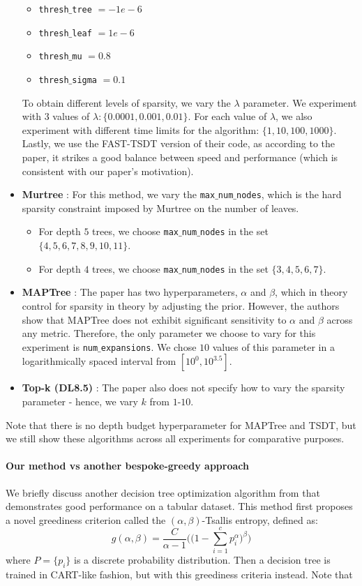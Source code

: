 \begin{itemize}
    \begin{itemize}
        \item \texttt{thresh$\_$tree} $= -1e-6$
        \item \texttt{thresh$\_$leaf} $= 1e-6$
        \item \texttt{thresh$\_$mu} $= 0.8$
        \item \texttt{thresh$\_$sigma} $= 0.1$
    \end{itemize}
    To obtain different levels of sparsity, we vary the $\lambda$ parameter. We experiment with $3$ values of $\lambda: \{0.0001, 0.001, 0.01\}$. For each value of $\lambda$, we also experiment with different time limits for the algorithm: $\{1,10,100,1000\}$. Lastly, we use the FAST-TSDT version of their code, as according to the paper, it strikes a good balance between speed and performance (which is consistent with our paper's motivation).
    \item \textbf{Murtree} \cite{murtree}: For this method, we vary the \texttt{max$\_$num$\_$nodes}, which is the hard sparsity constraint imposed by Murtree on the number of leaves. 
    \begin{itemize}
        \item For depth $5$ trees, we choose \texttt{max$\_$num$\_$nodes} in the set $\{4,5,6,7,8,9,10,11\}$. 
        \item For depth $4$ trees, we choose \texttt{max$\_$num$\_$nodes} in the set $\{3, 4,5,6,7\}$. 
    \end{itemize}
    \item \textbf{MAPTree} \cite{maptree}: The paper has two hyperparameters, $\alpha$ and $\beta$, which in theory control for sparsity in theory by adjusting the prior. However, the authors show that MAPTree does not exhibit significant sensitivity to $\alpha$ and $\beta$ across any metric. Therefore, the only parameter we choose to vary for this experiment is \texttt{num$\_$expansions}. We chose $10$ values of this parameter in a logarithmically spaced interval from $[10^0, 10^{3.5}]$. 
    \item \textbf{Top-k (DL8.5)} \cite{topk}: The paper also does not specify how to vary the sparsity parameter - hence, we vary $k$ from $1$-$10$. 
\end{itemize}
Note that there is no depth budget hyperparameter for MAPTree and TSDT, but we still show these algorithms across all experiments for comparative purposes.
\paragraph{Our method vs another bespoke-greedy approach}
We briefly discuss another decision tree optimization algorithm from \cite{slow_greedy} that demonstrates good performance on a tabular dataset. This method first proposes a novel greediness criterion called the $(\alpha,\beta)$-Tsallis entropy, defined as: 
\begin{equation}
    g(\alpha,\beta) = \frac{C}{\alpha-1}\Bigg(\Big(1-\sum_{i=1}^cp_i^\alpha\Big)^\beta\Bigg)
\end{equation}
where $P = \{p_i\}$ is a discrete probability distribution. Then a decision tree is trained in CART-like fashion, but with this greediness criteria instead. Note that 

